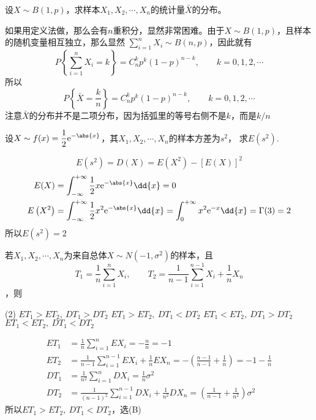 \begin{example}
    设$X\sim B(1,p)$，求样本$X_1,X_2,\cdots,X_n$的统计量$\bar{X}$的分布。
\end{example}
\begin{solution}
    如果用定义法做，那么会有$n$重积分，显然非常困难。由于$X\sim B(1,p)$，且样本的随机变量相互独立，那么显然
    $\displaystyle \sum_{i=1}^n X_i \sim B(n,p)$，因此就有
    \[ P\left\{ \sum_{i=1}^n X_i = k \right\} = C_n^kp^k(1-p)^{n-k}, \qquad k=0,1,2,\cdots \]
    所以
    \[ P\left\{ \bar{X} = \frac{k}{n} \right\} = C_n^kp^k(1-p)^{n-k}, \qquad k=0,1,2,\cdots \]
    注意$\bar{X}$的分布并不是二项分布，因为括弧里的等号右侧不是$k$，而是$k/n$
\end{solution}

\begin{example}
    设$\displaystyle X\sim f(x) = \frac{1}{2}\mathrm{e}^{-\abs{x}}$，其$X_1,X_2,\cdots,X_n$的样本方差为$s^2$，
    求$E(s^2)$.
\end{example}
\begin{solution}
    \[ E\left(s^2\right)  = D(X) = E\left(X^2\right) - [E(X)]^2 \]
    \begin{align*}
        E(X)              & = \int_{-\infty}^{+\infty}\frac{1}{2}x\mathrm{e}^{-\abs{x}}\dd{x} = 0 \\
        E\left(X^2\right) & = \int_{-\infty}^{+\infty} \frac{1}{2}x^2\mathrm{e}^{-\abs{x}} \dd{x}
        = \int_{0}^{+\infty}x^2\mathrm{e}^{-x}\dd{x} = \Gamma(3) = 2
    \end{align*}
    所以$E\left(s^2\right) = 2$
\end{solution}

\begin{example}
    若$X_1,X_2,\cdots,X_n$为来自总体$X\sim N\left(-1,\sigma^2\right)$的样本，且
    \[
        T_1 = \frac{1}{n}\sum_{i=1}^n X_i, \qquad T_2 = \frac{1}{n-1}\sum_{i=1}^{n-1}X_i + \frac{1}{n}X_n
    \]，则
    \begin{tasks}[label=(\Alph*),label-width = 2em](2)
        \task $ET_1 > ET_2,\ DT_1 > DT_2$
        \task $ET_1 > ET_2,\ DT_1 < DT_2$
        \task $ET_1 < ET_2,\ DT_1 > DT_2$
        \task $ET_1 < ET_2,\ DT_1 < DT_2$
    \end{tasks}
\end{example}
\begin{solution}
    \begin{align*}
        ET_1 & = \frac{1}{n}\sum_{i=1}^n EX_i = -\frac{n}{n} = -1                                                                   \\
        ET_2 & = \frac{1}{n-1}\sum_{i=1}^{n-1}EX_i + \frac{1}{n}EX_n = -\left(\frac{n-1}{n-1}+\frac{1}{n}\right) = -1 - \frac{1}{n} \\
        DT_1 & = \frac{1}{n^2}\sum_{i=1}^n DX_i = \frac{1}{n}\sigma^2                                                               \\
        DT_2 & = \frac{1}{(n-1)^2}\sum_{i=1}^{n-1}DX_i + \frac{1}{n^2}DX_n = \left(\frac{1}{n-1}+\frac{1}{n^2}\right)\sigma^2
    \end{align*}
    所以$ET_1>ET_2,\ DT_1<DT_2$，选(B)
\end{solution}


